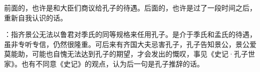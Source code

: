 {
\item 前面的，也许是和大臣们商议给孔子的待遇。后面的，也许是过了一段时间之后，重新自我认识的话。
\item {}：指齐景公无法以鲁君对季氏的同等规格来任用孔子。是介于季氏和孟氏的待遇，虽非专听专信，仍然很隆重。可后来有齐国大夫忌害孔子，孔子告知景公，景公爱莫能助，可能也自愧无法达到孔子的期望，才会发出的慨叹，事见《史记·孔子世家》。也有不同意《史记》的观点，认为后一句是孔子推辞的话。
}
{}


